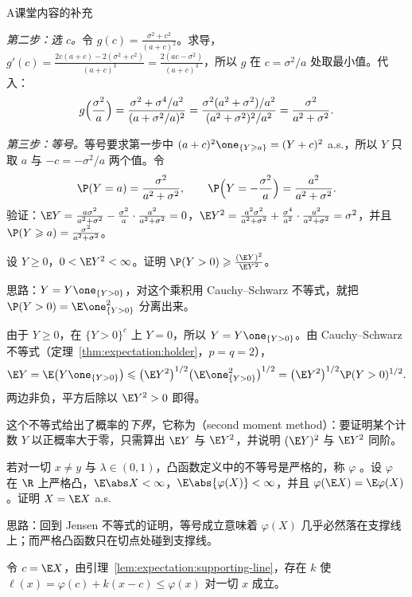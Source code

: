 \begin{exercises}{A}{课堂内容的补充}
\begin{solution}
\emph{第二步：选 $c$。}令 $g(c)=\frac{\sigma^2+c^2}{(a+c)^2}$。求导，$g'(c)=\frac{2c(a+c)-2(\sigma^2+c^2)}{(a+c)^3}=\frac{2(ac-\sigma^2)}{(a+c)^3}$，所以 $g$ 在 $c=\sigma^2/a$ 处取最小值。代入：
\[
g\Bigl(\frac{\sigma^2}a\Bigr)=\frac{\sigma^2+\sigma^4/a^2}{(a+\sigma^2/a)^2}=\frac{\sigma^2(a^2+\sigma^2)/a^2}{(a^2+\sigma^2)^2/a^2}=\frac{\sigma^2}{a^2+\sigma^2}.
\]

\emph{第三步：等号。}等号要求第一步中 $(a+c)^2\one_{\{Y\geqslant a\}}=(Y+c)^2$ a.s.，所以 $Y$ 只取 $a$ 与 $-c=-\sigma^2/a$ 两个值。令
\[
\P(Y=a)=\frac{\sigma^2}{a^2+\sigma^2},\qquad \P\Bigl(Y=-\frac{\sigma^2}a\Bigr)=\frac{a^2}{a^2+\sigma^2}.
\]
验证：$\E Y=\frac{a\sigma^2}{a^2+\sigma^2}-\frac{\sigma^2}a\cdot\frac{a^2}{a^2+\sigma^2}=0$，$\E Y^2=\frac{a^2\sigma^2}{a^2+\sigma^2}+\frac{\sigma^4}{a^2}\cdot\frac{a^2}{a^2+\sigma^2}=\sigma^2$，并且 $\P(Y\geqslant a)=\frac{\sigma^2}{a^2+\sigma^2}$。
\end{solution}

\item\label{ex:expectation:A5} 设 $Y\geqslant0$，$0<\E Y^2<\infty$。证明 $\P(Y>0)\geqslant\frac{(\E Y)^2}{\E Y^2}$。
\begin{solution}
思路：$Y=Y\one_{\{Y>0\}}$，对这个乘积用 Cauchy--Schwarz 不等式，就把 $\P(Y>0)=\E\one_{\{Y>0\}}^2$ 分离出来。

由于 $Y\geqslant0$，在 $\{Y>0\}^c$ 上 $Y=0$，所以 $Y=Y\one_{\{Y>0\}}$。由 Cauchy--Schwarz 不等式（定理~\ref{thm:expectation:holder}，$p=q=2$），
\[
\E Y=\E\bigl(Y\one_{\{Y>0\}}\bigr)\leqslant\bigl(\E Y^2\bigr)^{1/2}\bigl(\E\one_{\{Y>0\}}^2\bigr)^{1/2}=\bigl(\E Y^2\bigr)^{1/2}\P(Y>0)^{1/2}.
\]
两边非负，平方后除以 $\E Y^2>0$ 即得。

这个不等式给出了概率的\emph{下界}，它称为（second moment method）：要证明某个计数 $Y$ 以正概率大于零，只需算出 $\E Y$ 与 $\E Y^2$，并说明 $(\E Y)^2$ 与 $\E Y^2$ 同阶。
\end{solution}

\item\label{ex:expectation:A6} 若对一切 $x\neq y$ 与 $\lambda\in(0,1)$，凸函数定义中的不等号是严格的，称 $\varphi$ 。设 $\varphi$ 在 $\R$ 上严格凸，$\E\abs X<\infty$，$\E\abs{\varphi(X)}<\infty$，并且 $\varphi(\E X)=\E\varphi(X)$。证明 $X=\E X$ a.s.
\begin{solution}
思路：回到 Jensen 不等式的证明，等号成立意味着 $\varphi(X)$ 几乎必然落在支撑线上；而严格凸函数只在切点处碰到支撑线。

令 $c=\E X$，由引理~\ref{lem:expectation:supporting-line}，存在 $k$ 使 $\ell(x)=\varphi(c)+k(x-c)\leqslant\varphi(x)$ 对一切 $x$ 成立。


\end{solution}
\end{exercises}
